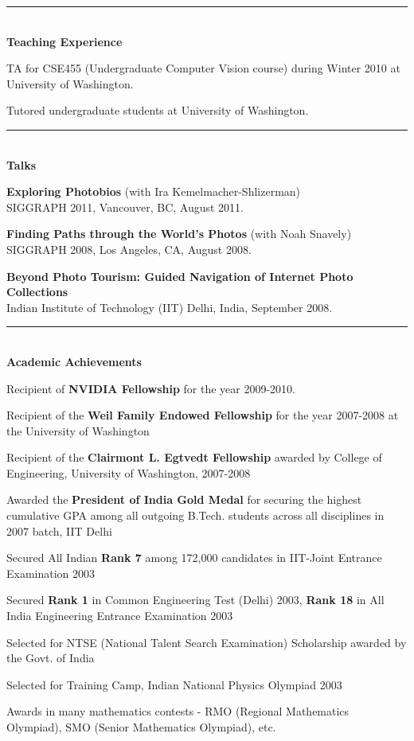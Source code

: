 \documentclass[10pt]{article}
\newenvironment{itemize*}%
  {\begin{itemize}%
    \setlength{\itemsep}{0pt}%
    \setlength{\parskip}{0pt}%
	}
  {\end{itemize}}
\begin{document}
\rule{6.5in}{2pt}
\\
\vspace{0.10in}
{\large \textbf{Teaching Experience}}
\begin{itemize*}
\item TA for CSE455 (Undergraduate Computer Vision course) during Winter 2010 at University of Washington.
\item Tutored undergraduate students at University of Washington.
\end{itemize*}
\rule{6.5in}{2pt}
\\
\vspace{0.10in}
{\large \textbf{Talks}}
\begin{itemize*}
\item \textbf{Exploring Photobios} (with Ira Kemelmacher-Shlizerman) 
\\
SIGGRAPH 2011, Vancouver, BC, August 2011.
\item \textbf{Finding Paths through the World's Photos} (with Noah Snavely) 
\\
SIGGRAPH 2008, Los Angeles, CA, August 2008.
\item \textbf{Beyond Photo Tourism: Guided Navigation of Internet Photo Collections} 
\\
Indian Institute of Technology (IIT) Delhi, India, September 2008.
\end{itemize*}
\rule{6.5in}{2pt}
\\
\vspace{0.10in}
{\large \textbf{Academic Achievements}}
\begin{itemize*}
\item Recipient of \textbf{NVIDIA Fellowship} for the year 2009-2010.
\item Recipient of the \textbf{Weil Family Endowed Fellowship} for the year 2007-2008 at the University of Washington
\item Recipient of the \textbf{Clairmont L. Egtvedt Fellowship} awarded by College of Engineering, University of Washington, 2007-2008
\item Awarded  the \textbf{President of India Gold Medal} for securing the highest cumulative GPA among all outgoing B.Tech. students  across all disciplines in 2007 batch, IIT Delhi
\item Secured All Indian \textbf{Rank 7} among 172,000 candidates in IIT-Joint Entrance Examination 2003
\item Secured \textbf{Rank 1} in Common Engineering Test (Delhi) 2003, \textbf{Rank 18} in All India Engineering Entrance Examination 2003
\item Selected for NTSE (National Talent Search Examination) Scholarship awarded by the Govt. of India
\item Selected for Training Camp, Indian  National Physics Olympiad 2003
\item Awards in many mathematics contests - RMO (Regional Mathematics Olympiad), SMO (Senior Mathematics Olympiad), etc.
\end{itemize*}
\end{document}
